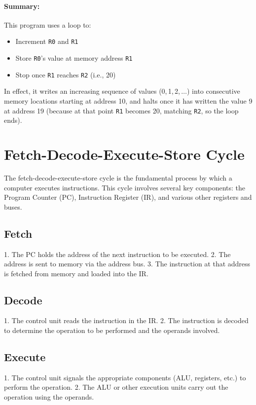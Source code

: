 \documentclass{report}
\begin{document}
\paragraph{Summary:}
This program uses a loop to:
\begin{itemize}
	\item Increment \texttt{R0} and \texttt{R1}
	\item Store \texttt{R0}’s value at memory address \texttt{R1}
	\item Stop once \texttt{R1} reaches \texttt{R2} (i.e., 20)
\end{itemize}
In effect, it writes an increasing sequence of values (0,\,1,\,2,\,$\ldots$) into consecutive memory locations starting at address 10, and halts once it has written the value 9 at address 19 (because at that point \texttt{R1} becomes 20, matching \texttt{R2}, so the loop ends).

\section{Fetch-Decode-Execute-Store Cycle}

The fetch-decode-execute-store cycle is the fundamental process by which a computer executes instructions. This cycle involves several key components: the Program Counter (PC), Instruction Register (IR), and various other registers and buses.

\subsection{Fetch}

1. The PC holds the address of the next instruction to be executed.
2. The address is sent to memory via the address bus.
3. The instruction at that address is fetched from memory and loaded into the IR.

\subsection{Decode}

1. The control unit reads the instruction in the IR.
2. The instruction is decoded to determine the operation to be performed and the operands involved.

\subsection{Execute}

1. The control unit signals the appropriate components (ALU, registers, etc.) to perform the operation.
2. The ALU or other execution units carry out the operation using the operands.
\end{document}
